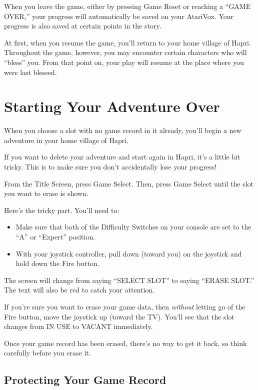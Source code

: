 \documentclass[10pt,twoside,openright]{memoir}
\begin{document}
When you leave the game, either by pressing Game Reset or reaching a
``GAME OVER,'' your progress will automatically be saved on your
AtariVox. Your progress is also saved at certain points in the story.

At first, when you resume the game, you'll return to your home village
of Hapri. Throughout the game, however, you may encounter certain
characters who will ``bless'' you. From that point on, your play will
resume at the place where you were last blessed.

\section{Starting Your Adventure Over}\label{Starting Your Adventure Over}

When you choose a slot with no game record in it already, you'll begin
a new adventure in your home village of Hapri.

If you want to delete your adventure and start again in Hapri, it's a
little bit tricky. This is to make sure you don't accidentally lose
your progress!

From the Title Screen, press Game Select. Then, press Game Select
until the slot you want to erase is shown.

Here's the tricky part. You'll need to:

\begin{itemize}
\item Make sure that both of the Difficulty Switches on your console
  are set to the ``A'' or ``Expert'' position.
\item With your joystick controller, pull down (toward you) on the
  joystick and hold down the Fire button.
\end{itemize}

The screen will change from saying ``SELECT SLOT'' to saying ``ERASE
SLOT.'' The text will also be red to catch your attention.

If you're sure you want to erase your game data, then \emph{without}
letting go of the Fire button, move the joystick up (toward the
TV). You'll see that the slot changes from IN USE to VACANT
immediately.

Once your game record has been erased, there's no way to get it back,
so think carefully before you erase it.

\subsection{Protecting Your Game Record}
\end{document}

